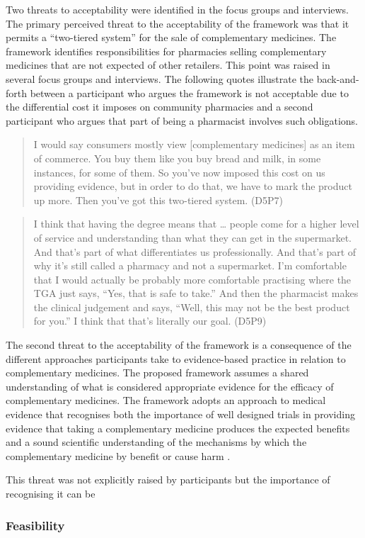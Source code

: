 \documentclass[11pt,a4paper]{article}
\begin{document}
Two threats to acceptability were identified in the focus groups and
interviews. The primary perceived threat to the acceptability of the
framework was that it permits a ``two-tiered system'' for the sale of
complementary medicines. The framework identifies responsibilities for
pharmacies selling complementary medicines that are not expected of
other retailers. This point was raised in several focus groups and
interviews. The following quotes illustrate the back-and-forth between a
participant who argues the framework is not acceptable due to the
differential cost it imposes on community pharmacies and a second
participant who argues that part of being a pharmacist involves such
obligations.

\begin{quote}
I would say consumers mostly view {[}complementary medicines{]} as an
item of commerce. You buy them like you buy bread and milk, in some
instances, for some of them. So you've now imposed this cost on us
providing evidence, but in order to do that, we have to mark the product
up more. Then you've got this two-tiered system. (D5P7)
\end{quote}

\begin{quote}
I think that having the degree means that \ldots{} people come for a
higher level of service and understanding than what they can get in the
supermarket. And that's part of what differentiates us professionally.
And that's part of why it's still called a pharmacy and not a
supermarket. I'm comfortable that I would actually be probably more
comfortable practising where the TGA just says, ``Yes, that is safe to
take.'' And then the pharmacist makes the clinical judgement and says,
``Well, this may not be the best product for you.'' I think that that's
literally our goal. (D5P9)
\end{quote}

The second threat to the acceptability of the framework is a consequence
of the different approaches participants take to evidence-based practice
in relation to complementary medicines. The proposed framework assumes a
shared understanding of what is considered appropriate evidence for the
efficacy of complementary medicines. The framework adopts an approach to
medical evidence that recognises both the importance of well designed
trials in providing evidence that taking a complementary medicine
produces the expected benefits and a sound scientific understanding of
the mechanisms by which the complementary medicine by benefit or cause
harm \autocite{Parkkinen2018a}.

This threat was not explicitly raised by participants but the importance
of recognising it can be

\subsubsection{Feasibility}\label{feasibility}

\printbibliography[title=References]
\end{document}
